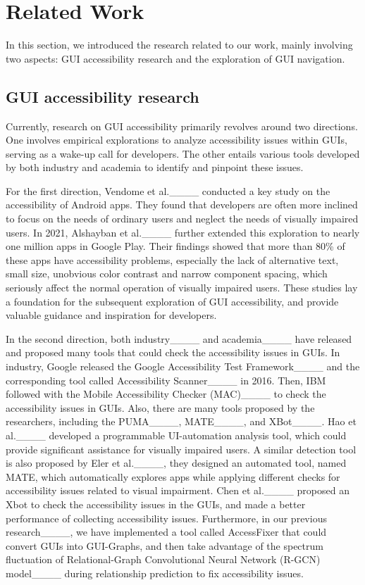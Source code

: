 \section{Related Work}
\label{sec: related work}

In this section, we introduced the research related to our work, mainly involving two aspects: GUI accessibility research and the exploration of GUI navigation.

\subsection{GUI accessibility research}

Currently, research on GUI accessibility primarily revolves around two directions. 
One involves empirical explorations to analyze accessibility issues within GUIs, serving as a wake-up call for developers. 
The other entails various tools developed by both industry and academia to identify and pinpoint these issues.

For the first direction, Vendome et al.____ conducted a key study on the accessibility of Android apps. 
They found that developers are often more inclined to focus on the needs of ordinary users and neglect the needs of visually impaired users.
In 2021, Alshayban et al.____ further extended this exploration to nearly one million apps in Google Play.
Their findings showed that more than 80\% of these apps have accessibility problems, especially the lack of alternative text, small size, unobvious color contrast and narrow component spacing, which seriously affect the normal operation of visually impaired users.
These studies lay a foundation for the subsequent exploration of GUI accessibility, and provide valuable guidance and inspiration for developers.

In the second direction, both industry____ and academia____ have released and proposed many tools that could check the accessibility issues in GUIs.
In industry, Google released the Google Accessibility Test Framework____ and the corresponding tool called Accessibility Scanner____ in 2016.
Then, IBM followed with the Mobile Accessibility Checker (MAC)____ to check the accessibility issues in GUIs.
Also, there are many tools proposed by the researchers, including the PUMA____, MATE____, and XBot____.
Hao et al.____ developed a programmable UI-automation analysis tool, which could provide significant assistance for visually impaired users.
A similar detection tool is also proposed by Eler et al.____, they designed an automated tool, named MATE, which automatically explores apps while applying different checks for accessibility issues related to visual impairment.
Chen et al.____ proposed an Xbot to check the accessibility issues in the GUIs, and made a better performance of collecting accessibility issues.
Furthermore, in our previous research____, we have implemented a tool called AccessFixer that could convert GUIs into GUI-Graphs, and then take advantage of the spectrum fluctuation of Relational-Graph Convolutional Neural Network (R-GCN) model____ during relationship prediction to fix accessibility issues.

